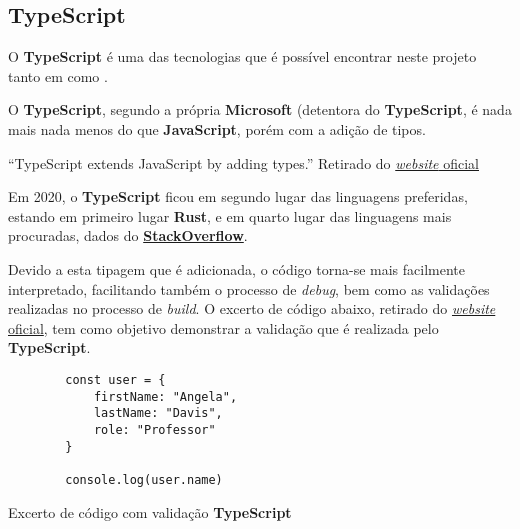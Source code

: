 \subsection{TypeScript}

\begin{minipage}[t]{.3\textwidth}
\end{minipage}
\begin{minipage}[t]{.7\textwidth}
	\minipagerestore

	O \textbf{TypeScript} é uma das tecnologias que é possível encontrar neste projeto tanto em  como .

	O \textbf{TypeScript}, segundo a própria \textbf{Microsoft} (detentora do \textbf{TypeScript}, é nada mais nada menos do que \textbf{JavaScript}, porém com a adição de tipos.

	\begin{quotebox}
		``TypeScript extends JavaScript by adding types.''
		\tcblower
		Retirado do \href{https://www.typescriptlang.org}{\textit{website} oficial}
	\end{quotebox}

\end{minipage}

\vspace{0.2cm}

Em 2020, o \textbf{TypeScript} ficou em segundo lugar das linguagens preferidas, estando em primeiro lugar \textbf{Rust}, e em quarto lugar das linguagens mais procuradas, dados do \href{https://insights.stackoverflow.com/survey/2020#technology-most-loved-dreaded-and-wanted-languages-loved}{\textbf{StackOverflow}}.

Devido a esta tipagem que é adicionada, o código torna-se mais facilmente interpretado, facilitando também o processo de \textit{debug}, bem como as validações realizadas no processo de \textit{build}. O excerto de código abaixo, retirado do \href{https://www.typescriptlang.org}{\textit{website} oficial}, tem como objetivo demonstrar a validação que é realizada pelo \textbf{TypeScript}.

\begin{longlisting}
	\begin{verbatim}
		const user = {
			firstName: "Angela",
			lastName: "Davis",
			role: "Professor"
		}

		console.log(user.name)
	\end{verbatim}

	\caption{Excerto de código com validação \textbf{TypeScript}}
\end{longlisting}

